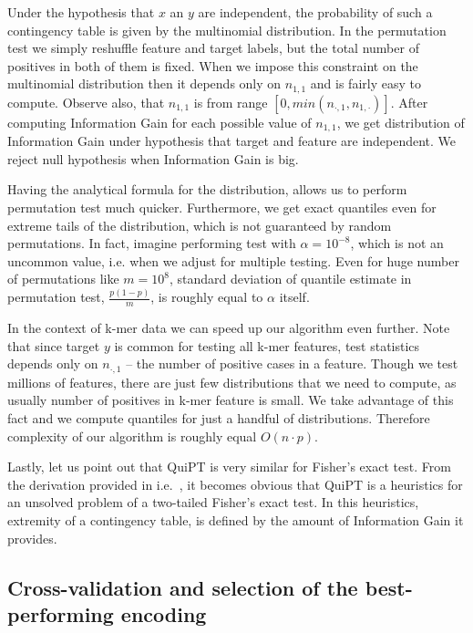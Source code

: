 \documentclass{bioinfo}
\begin{document}
\begin{methods}
  Under the hypothesis that $x$ an $y$ are independent, the probability of such 
a contingency  table is given by the multinomial distribution. In the 
permutation test we simply reshuffle feature and target labels, but the total 
number of positives in both of them is fixed. When we impose this constraint on 
the multinomial distribution then it depends only on $n_{1,1}$ and is fairly 
easy to compute. Observe also, that $n_{1,1}$ is from range $[0,min(n_{\cdot, 
1}, n_{1, \cdot})]$. After computing Information Gain for each possible value 
of $n_{1,1}$, we get distribution of Information Gain under hypothesis that 
target and feature are independent. We reject null hypothesis when Information 
Gain is big.

  Having the analytical formula for the distribution, allows us to perform 
permutation test much quicker. Furthermore, we get exact quantiles even for 
extreme tails of the distribution, which is not guaranteed by random 
permutations. In fact, imagine performing test with $\alpha=10^{-8}$, which is 
not an uncommon value, i.e. when we adjust for multiple testing. Even for huge 
number of permutations like $m=10^8$, standard deviation of quantile estimate in 
permutation test, $\frac{p(1-p)}{m}$, is roughly equal to $\alpha$ itself.

  In the context of k-mer data we can speed up our algorithm even further. Note 
that since target $y$ is common for testing all k-mer features, test statistics 
depends only on $n_{\cdot, 1}$ -- the number of positive cases in a feature. 
Though we test millions of features, there are just few distributions that we 
need to compute, as usually number of positives in k-mer feature is small. We 
take advantage of this fact and we compute quantiles for just a handful of 
distributions. Therefore complexity of our algorithm is roughly equal $O(n\cdot 
p)$.

  Lastly, let us point out that QuiPT is very similar for Fisher's exact test. 
From the derivation provided in i.e.~\citep{lehmann2008testing}, it becomes 
obvious that QuiPT is a heuristics for an unsolved problem of a two-tailed 
Fisher's exact test. In this heuristics, extremity of a contingency table, is 
defined by the amount of Information Gain it provides.

\subsection{Cross-validation and selection of the best-performing encoding}


\end{methods}
\end{document}
